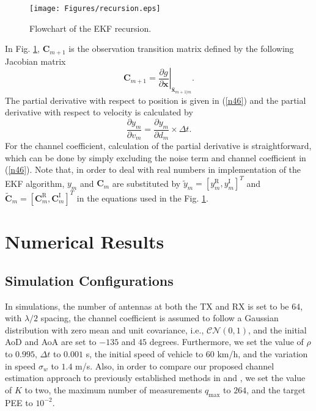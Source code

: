 \documentclass{ieeeaccess}
\begin{document}
\begin{figure}[t]
\centering
\texttt{[image: Figures/recursion.eps]}
\centering
\caption{Flowchart of the EKF recursion.}
\label{recursion}
\end{figure}
In Fig. \ref{recursion}, $\boldsymbol{C}_{m+1}$ is the observation transition matrix defined by the following Jacobian matrix
\begin{equation} \label{n60}
\boldsymbol{C}_{m+1} = \left.\frac{\partial g}{\partial\boldsymbol{x}}\right|_{\widehat{\boldsymbol{x}}_{m+1|m}}.
\end{equation}
The partial derivative with respect to position is given in (\ref{n46}) and the partial derivative with respect to velocity is calculated by
\begin{equation}\label{n61}
\frac{\partial y_m}{\partial v_m} = \frac{\partial y_m}{\partial d_m} \times \Delta t.
\end{equation}
For the channel coefficient, calculation of the partial derivative is straightforward, which can be done by simply excluding the noise term and channel coefficient in (\ref{n46}).
Note that, in order to deal with real numbers in implementation of the EKF algorithm, $y_m$ and $\boldsymbol{C}_m$ are substituted by $\widetilde{y}_m = [y_m^\textrm{R}, y_m^\textrm{I}]^T$ and $\widetilde{\boldsymbol{C}}_m = [\boldsymbol{C}_m^\textrm{R}, \boldsymbol{C}_m^\textrm{I}]^T$ in the equations used in the Fig. \ref{recursion}.








\section{Numerical Results }\label{aaa}
\subsection{Simulation Configurations}


In simulations, the number of antennas at both the TX and RX is set to be $64$, with $\lambda/2$ spacing, the channel coefficient is assumed to follow a Gaussian distribution with zero mean and unit covariance, i.e., $\mathcal{C}\mathcal{N}(0,1)$, and the initial AoD and AoA are set to $-135$ and $45$ degrees. Furthermore, we set the value of $\rho$ to $0.995$, $\Delta t$ to  $0.001$ s, the initial speed of vehicle to $60$ km/h, and the variation in speed $\sigma_w $ to $1.4 $ m/s. Also, in order to compare our proposed channel estimation approach to previously established methods in \cite{RH} and \cite{RACE}, we set the value of $K$ to two, the maximum number of measurements $q_{\textrm{max}}$ to $264$, and the target PEE to $ 10^{-2}$.
\end{document}
